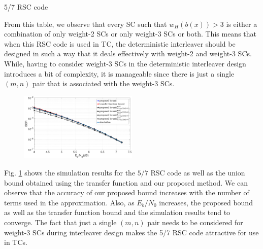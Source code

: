 \begin{example} {5/7 RSC code}
\begin{table}[htbp]
	\label{novelTab13}
\end{table}

From this table, we observe that every SC such that $w_H(b(x)) >3$ is either a combination of only weight-2 SCs or only weight-3 SCs or both. This means that when this RSC code is used in TC, the deterministic interleaver should be designed in such a way that it deals effectively with weight-2 and weight-3 SCs. While, having to consider weight-3 SCs in the deterministic interleaver design introduces a bit of complexity, it is manageable since there is just a single $(m,n)$ pair that is associated with the weight-3 SCs.

\begin{figure}[htbp]
	\centering
	\includegraphics[width=0.5\textwidth]{./Images/RSC_5_7_lower_weights2.eps}
	\label{simFig1}
\end{figure}

Fig. \ref{simFig1} shows the simulation results for the $5/7$ RSC code as well as the union bound obtained using the transfer function and our proposed method. We can observe that the accuracy of our proposed bound increases with the number of terms used in the approximation. Also, as $E_b/N_0$ increases, the proposed bound as well as the transfer function bound and the simulation results tend to converge. The fact that just a single $(m,n)$ pair needs to be considered for weight-3 SCs during interleaver design makes the 5/7 RSC code attractive for use in TCs.
\label{ex-6}
\end{example}


